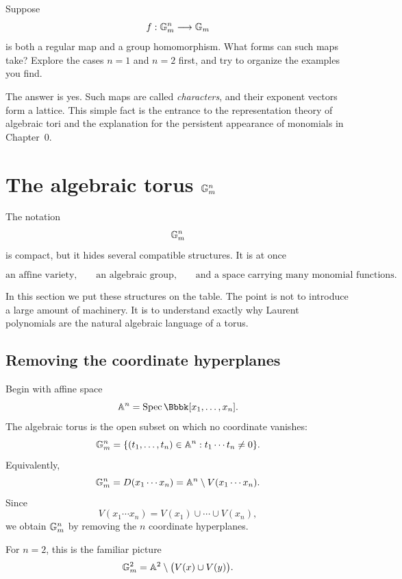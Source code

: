 \begin{prediction}
Suppose
\[
f:\mathbb{G}_{m}^n\longrightarrow\mathbb{G}_{m}
\]
is both a regular map and a group homomorphism. What forms can such
maps take? Explore the cases \(n=1\) and \(n=2\) first, and try to
organize the examples you find.
\end{prediction}

The answer is yes. Such maps are called \emph{characters}, and their
exponent vectors form a lattice. This simple fact is the entrance to
the representation theory of algebraic tori and the explanation for
the persistent appearance of monomials in Chapter~0.


\section{The algebraic torus
\texorpdfstring{\(\mathbb{G}_{m}^n\)}{Gm n}}
\label{sec:algebraic-torus-gn}

The notation
\[
\mathbb{G}_{m}^n
\]
is compact, but it hides several compatible structures. It is at once

\[
\text{an affine variety,}
\qquad
\text{an algebraic group,}
\qquad
\text{and a space carrying many monomial functions.}
\]

In this section we put these structures on the table. The point is not
to introduce a large amount of machinery. It is to understand exactly
why Laurent polynomials are the natural algebraic language of a torus.

\subsection{Removing the coordinate hyperplanes}

Begin with affine space
\[
\AAA^n=\Spec\Bbbk[x_1,\ldots,x_n].
\]
The algebraic torus is the open subset on which no coordinate vanishes:
\[
\mathbb{G}_{m}^n
=
\{(t_1,\ldots,t_n)\in\mathbb{A}^n:t_1\cdots t_n\neq0\}.
\]
Equivalently,
\[
\mathbb{G}_{m}^n
=
D(x_1\cdots x_n)
=
\mathbb{A}^n\setminus V(x_1\cdots x_n).
\]
Since
\[
V(x_1\cdots x_n)
=
V(x_1)\cup\cdots\cup V(x_n),
\]
we obtain \(\mathbb{G}_{m}^n\) by removing the \(n\) coordinate hyperplanes.

For \(n=2\), this is the familiar picture
\[
\mathbb{G}_{m}^2
=
\mathbb{A}^2\setminus\bigl(V(x)\cup V(y)\bigr).
\]

